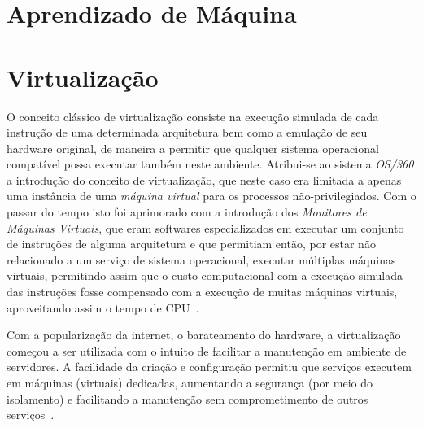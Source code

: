 %
%

\chapter{Aprendizado de Máquina}\label{sec:aprendizado}



\chapter{Virtualização}\label{sec:virt}

O conceito clássico de virtualização consiste na execução simulada de cada
instrução de uma determinada arquitetura bem como a emulação de seu hardware
original, de maneira a permitir que qualquer sistema operacional compatível
possa executar também neste ambiente.  Atribui-se ao sistema \emph{OS/360} a
introdução do conceito de virtualização, que neste caso era limitada a apenas
uma instância de uma \emph{máquina virtual} para os processos
não-privilegiados. Com o passar do tempo isto foi aprimorado com a introdução
dos \emph{Monitores de Máquinas Virtuais}, que eram softwares especializados em
executar um conjunto de instruções de alguma arquitetura e que permitiam então,
por estar não relacionado a um serviço de sistema operacional, executar
múltiplas máquinas virtuais, permitindo assim que o custo computacional com a
execução simulada das instruções fosse compensado com a execução de muitas
máquinas virtuais, aproveitando assim o tempo de CPU~\cite{goldberg1974survey}.

Com a popularização da internet, o barateamento do hardware, a
virtualização começou a ser utilizada com o intuito de facilitar a
manutenção em ambiente de servidores. A facilidade da criação e
configuração permitiu que serviços executem em máquinas (virtuais)
dedicadas, aumentando a segurança (por meio do isolamento) e facilitando a
manutenção sem comprometimento de outros serviços~\cite{peter2005resource}.



\section{\libvirt}\label{sec:libvirt}

